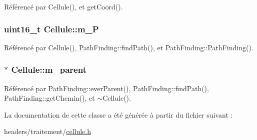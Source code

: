 Référencé par Cellule(), et get\-Coord().

\hypertarget{classCellule_af7cb9856701ea3e423f58b09bb7dfdbd}{
\subsubsection[{m\-\_\-\-P}]{\setlength{\rightskip}{0pt plus 5cm}uint16\-\_\-t Cellule\-::m\-\_\-\-P}}\label{classCellule_af7cb9856701ea3e423f58b09bb7dfdbd}


Référencé par Cellule(), Path\-Finding\-::find\-Path(), et Path\-Finding\-::\-Path\-Finding().

\hypertarget{classCellule_a3f4117017976fde614e72d38ea10d734}{
\subsubsection[{m\-\_\-parent}]{$\ast$ Cellule\-::m\-\_\-parent}}\label{classCellule_a3f4117017976fde614e72d38ea10d734}


Référencé par Path\-Finding\-::ever\-Parent(), Path\-Finding\-::find\-Path(), Path\-Finding\-::get\-Chemin(), et $\sim$\-Cellule().



La documentation de cette classe a été générée à partir du fichier suivant \-:\begin{DoxyCompactItemize}
\item 
headers/traitement/\hyperlink{cellule_8h}{cellule.\-h}\end{DoxyCompactItemize}
